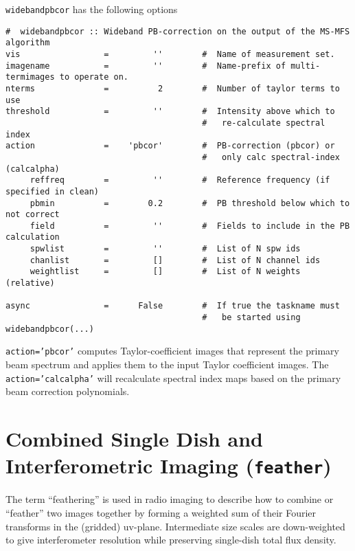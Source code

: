{\tt widebandpbcor} has the following options

\small
\begin{verbatim}
#  widebandpbcor :: Wideband PB-correction on the output of the MS-MFS algorithm
vis                 =         ''        #  Name of measurement set.
imagename           =         ''        #  Name-prefix of multi-termimages to operate on.
nterms              =          2        #  Number of taylor terms to use
threshold           =         ''        #  Intensity above which to
                                        #   re-calculate spectral index
action              =    'pbcor'        #  PB-correction (pbcor) or
                                        #   only calc spectral-index (calcalpha)
     reffreq        =         ''        #  Reference frequency (if specified in clean)
     pbmin          =        0.2        #  PB threshold below which to not correct
     field          =         ''        #  Fields to include in the PB calculation
     spwlist        =         ''        #  List of N spw ids
     chanlist       =         []        #  List of N channel ids
     weightlist     =         []        #  List of N weights (relative)

async               =      False        #  If true the taskname must
                                        #   be started using widebandpbcor(...)
\end{verbatim}
\normalsize  

{\tt action='pbcor'} computes Taylor-coefficient images that represent
the primary beam spectrum and applies them to the input Taylor
coefficient images. The {\tt action='calcalpha'} will recalculate
spectral index maps based on the primary beam correction polynomials. 


\section{Combined Single Dish and Interferometric Imaging 
         ({\tt feather})}
\label{section:im.feather}

The term ``feathering'' is used in radio imaging to describe how to
combine or ``feather'' two images together by forming a weighted
sum of their Fourier transforms in the (gridded) uv-plane.
Intermediate size scales are down-weighted to give interferometer
resolution while preserving single-dish total flux density.

